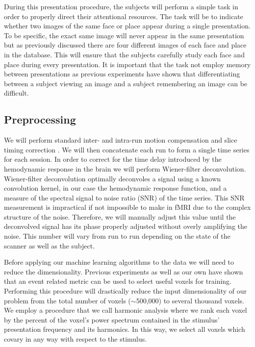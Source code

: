 \documentclass[12pt]{article}
\begin{document}
During this presentation procedure, the subjects will perform a simple task in order to properly direct their attentional resources.
The task will be to indicate whether two images of the same face or place appear during a single presentation.
To be specific, the exact same image will never appear in the same presentation but as previously discussed there are four different images of each face and place in the database.
This will ensure that the subjects carefully study each face and place during every presentation.
It is important that the task not employ memory between presentations as previous experiments \cite{Lewis-Peacock2012} have shown that differentiating between a subject viewing an image and a subject remembering an image can be difficult.

\subsection{Preprocessing}
We will perform standard inter- and intra-run motion compensation \cite{Nestares2000} and slice timing correction \cite{Sladky2011}.
We will then concatenate each run to form a single time series for each session.
In order to correct for the time delay introduced by the hemodynamic response in the brain we will perform Wiener-filter deconvolution.
Wiener-filter deconvolution optimally deconvoles a signal using a known convolution kernel, in our case the hemodynamic response function, and a measure of the spectral signal to noise ratio (SNR) of the time series.
This SNR measurement is impractical if not impossible to make in fMRI due to the complex structure of the noise.
Therefore, we will manually adjust this value until the deconvolved signal has its phase properly adjusted without overly amplifying the noise.
This number will vary from run to run depending on the state of the scanner as well as the subject.

Before applying our machine learning algorithms to the data we will need to reduce the dimensionality.
Previous experiments \cite{Pereira2009} as well as our own have shown that an event related metric can be used to select useful voxels for training.
Performing this procedure will drastically reduce the input dimensionality of our problem from the total number of voxels ($\sim$500,000) to several thousand voxels.
We employ a procedure that we call harmonic analysis where we rank each voxel by the percent of the voxel's power spectrum contained in the stimulus' presentation frequency and its harmonics.
In this way, we select all voxels which covary in any way with respect to the stimulus.
\end{document}
